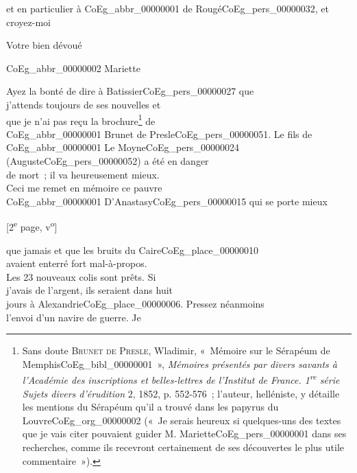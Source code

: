\documentclass{book}
\begin{document}
et en particulier à \gls{CoEg_abbr_00000001} de Rougé\gls{CoEg_pers_00000032}, et\\
croyez-moi
\begin{center} Votre bien dévoué\end{center}
\begin{center}\hspace{1cm}\gls{CoEg_abbr_00000002} Mariette\end{center}
Ayez la bonté de dire à Batissier\gls{CoEg_pers_00000027} que\\
j’attends toujours de ses nouvelles et\\
que je n’ai pas reçu la brochure\footnote{Sans doute \textsc{Brunet de Presle}, Wladimir, «~Mémoire sur le Sérapéum de Memphis\gls{CoEg_bibl_00000001}~», \textit{Mémoires présentés par divers savants à l'Académie des inscriptions et belles-lettres de l'Institut de France. 1\textsuperscript{re} série Sujets divers d'érudition} 2, 1852, p. 552-576~; l'auteur, helléniste, y détaille les mentions du Sérapéum qu'il a trouvé dans les papyrus du Louvre\gls{CoEg_org_00000002} («~Je serais heureux si quelques-uns des textes que je vais citer pouvaient guider M. Mariette\gls{CoEg_pers_00000001} dans ses recherches, comme ils recevront certainement de ses découvertes le plus utile commentaire~»).} de\\
\gls{CoEg_abbr_00000001} Brunet de Presle\gls{CoEg_pers_00000051}. Le fils de\\
\gls{CoEg_abbr_00000001} Le Moyne\gls{CoEg_pers_00000024} (Auguste\gls{CoEg_pers_00000052}) a été en danger\\
de mort~; il va heureusement mieux.\\
Ceci me remet en mémoire ce pauvre\\
\gls{CoEg_abbr_00000001} D’Anastasy\gls{CoEg_pers_00000015} qui se porte mieux
{\footnotesize \begin{center} {[2\textsuperscript{e} page, v\textsuperscript{o}]}\end{center}}
\noindent que jamais et que les bruits du Caire\gls{CoEg_place_00000010}\\
avaient enterré fort mal-à-propos.\\
\indent Les 23 nouveaux colis sont prêts. Si\\
j’avais de l’argent, ils seraient dans huit\\
jours à Alexandrie\gls{CoEg_place_00000006}. Pressez néanmoins\\
l’envoi d’un navire de guerre. Je\\
\end{document}
